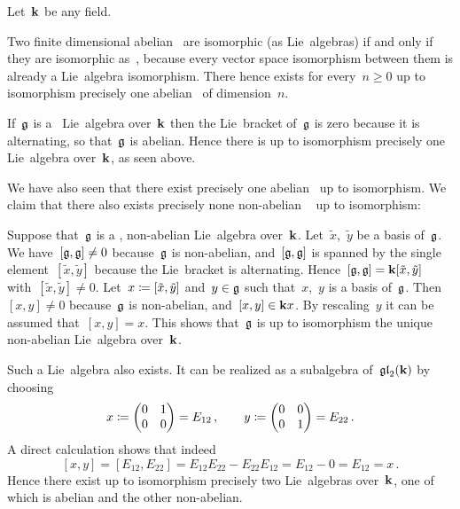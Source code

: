 \begin{example}
  Let~$\kf$ be any field.
  
  Two finite dimensional abelian~{\liealgebras{$\kf$}} are isomorphic (as Lie~algebras) if and only if they are isomorphic as~{\vectorspaces{$\kf$}}, because every vector space isomorphism between them is already a Lie~algebra isomorphism.
  There hence exists for every~$n \geq 0$ up to isomorphism precisely one abelian~{\liealgebra{$\kf$}} of dimension~$n$.
  
  If~$\mathfrak{g}$ is a~{\onedimensional} Lie~algebra over~$\kf$ then the Lie~bracket of~$\mathfrak{g}$ is zero because it is alternating, so that~$\mathfrak{g}$ is abelian.
  Hence there is up to isomorphism precisely one {\onedimensional} Lie~algebra over~$\kf$, as seen above.
  
  We have also seen that there exist precisely one {\twodimensional} abelian~{\liealgebra{$\kf$}} up to isomorphism.
  We claim that there also exists precisely none non-abelian {\twodimensional}~{\liealgebra{$\kf$}} up to isomorphism:
  
  Suppose that~$\mathfrak{g}$ is a {\twodimensional}, non-abelian Lie~algebra over~$\kf$.
  Let~$\tilde{x}$,~$\tilde{y}$ be a basis of~$\mathfrak{g}$.
  We have~$[\mathfrak{g},\mathfrak{g}] \neq 0$ because~$\mathfrak{g}$ is non-abelian, and~$[\mathfrak{g}, \mathfrak{g}]$ is spanned by the single element~$[\tilde{x}, \tilde{y}]$ because the Lie~bracket is alternating.
  Hence~$[\mathfrak{g}, \mathfrak{g}] = \mathbf{k} [\tilde{x}, \tilde{y}]$ with~$[\tilde{x}, \tilde{y}] \neq 0$.
  Let~$x \coloneqq [\tilde{x},\tilde{y}]$ and~$y \in \mathfrak{g}$ such that~$x$,~$y$ is a basis of~$\mathfrak{g}$.
  Then~$[x,y] \neq 0$ because~$\mathfrak{g}$ is non-abelian, and~$[x,y] \in \mathbf{k} x$.
  By rescaling~$y$ it can be assumed that~$[x,y] = x$.
 This shows that~$\mathfrak{g}$ is up to isomorphism the unique {\twodimensional} non-abelian Lie~algebra over~$\kf$.
 
  Such a Lie~algebra also exists.
  It can be realized as a subalgebra of~$\mathfrak{gl}_2(\mathbf{k})$ by choosing
  \[
    x
    \coloneqq
    \begin{pmatrix}
      0 & 1 \\
      0 & 0
    \end{pmatrix}
    =
    E_{12}  \,,
    \qquad
    y
    \coloneqq
    \begin{pmatrix}
      0 & 0 \\
      0 & 1
    \end{pmatrix}
    =
    E_{22}  \,.
  \]
  A direct calculation shows that indeed
  \[
    [x,y]
    =
    [E_{12}, E_{22}]
    =
    E_{12} E_{22} - E_{22} E_{12}
    =
    E_{12} - 0
    =
    E_{12}
    =
    x \,.
  \]
  Hence there exist up to isomorphism precisely two {\twodimensional} Lie~algebras over~$\kf$, one of which is abelian and the other non-abelian.
\end{example}



